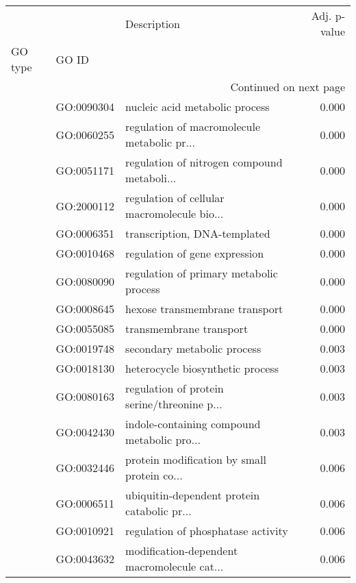 \begin{longtable}{lllr}
\toprule
   &            &                                  Description &  Adj. p-value \\
GO type & GO ID &                                              &               \\
\midrule
\endhead
\midrule
\multicolumn{4}{r}{{Continued on next page}} \\
\midrule
\endfoot

\bottomrule
\endlastfoot
\multirow{57}{*}{BP} & GO:0090304 &               nucleic acid metabolic process &         0.000 \\
   & GO:0060255 &  regulation of macromolecule metabolic pr... &         0.000 \\
   & GO:0051171 &  regulation of nitrogen compound metaboli... &         0.000 \\
   & GO:2000112 &  regulation of cellular macromolecule bio... &         0.000 \\
   & GO:0006351 &                 transcription, DNA-templated &         0.000 \\
   & GO:0010468 &                regulation of gene expression &         0.000 \\
   & GO:0080090 &      regulation of primary metabolic process &         0.000 \\
   & GO:0008645 &               hexose transmembrane transport &         0.000 \\
   & GO:0055085 &                      transmembrane transport &         0.000 \\
   & GO:0019748 &                  secondary metabolic process &         0.003 \\
   & GO:0018130 &             heterocycle biosynthetic process &         0.003 \\
   & GO:0080163 &  regulation of protein serine/threonine p... &         0.003 \\
   & GO:0042430 &  indole-containing compound metabolic pro... &         0.003 \\
   & GO:0032446 &  protein modification by small protein co... &         0.006 \\
   & GO:0006511 &  ubiquitin-dependent protein catabolic pr... &         0.006 \\
   & GO:0010921 &           regulation of phosphatase activity &         0.006 \\
   & GO:0043632 &  modification-dependent macromolecule cat... &         0.006 \\

\end{longtable}
